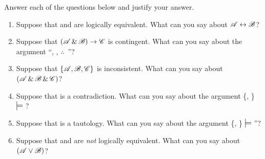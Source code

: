 \noindent\problempart
\label{pr.TT.concepts}
Answer each of the questions below and justify your answer.
\begin{enumerate}
\item Suppose that  and  are logically equivalent. What can you say about $\mathscr{A}\leftrightarrow\mathscr{B}$?
\item Suppose that $(\mathscr{A}\,\&\,\mathscr{B})\rightarrow\mathscr{C}$ is contingent. What can you say about the argument ``, , $\therefore$\ ''?
\item Suppose that $\{\mathscr{A},\mathscr{B}, \mathscr{C}\}$ is inconsistent. What can you say about $(\mathscr{A}\,\&\,\mathscr{B}\,\&\,\mathscr{C})$?
\item Suppose that  is a contradiction. What can you say about the argument \{, \} $\sdtstile{}{}$  ?
\item Suppose that  is a tautology. What can you say about the argument \{, \} $\sdtstile{}{}$ ''?
\item Suppose that  and  are \emph{not} logically equivalent. What can you say about $(\mathscr{A}\vee\mathscr{B})$?
\end{enumerate}

